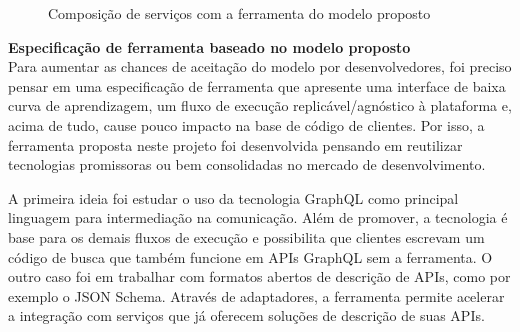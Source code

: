 \begin{figure}[H]
  \centering
  \caption{Composição de serviços com a ferramenta do modelo proposto}
\end{figure}

\textbf{Especificação de ferramenta baseado no modelo proposto} \\

Para aumentar as chances de aceitação do modelo por desenvolvedores, foi preciso pensar em uma especificação de ferramenta que apresente uma interface de baixa curva de aprendizagem, um fluxo de execução replicável/agnóstico à plataforma e, acima de tudo, cause pouco impacto na base de código de clientes. Por isso, a ferramenta proposta neste projeto foi desenvolvida pensando em reutilizar tecnologias promissoras ou bem consolidadas no mercado de desenvolvimento.

A primeira ideia foi estudar o uso da tecnologia GraphQL como principal linguagem para intermediação na comunicação. Além de promover, a tecnologia é base para os demais fluxos de execução e possibilita que clientes escrevam um código de busca que também funcione em APIs GraphQL sem a ferramenta. O outro caso foi em trabalhar com formatos abertos de descrição de APIs, como por exemplo o JSON Schema. Através de adaptadores, a ferramenta permite acelerar a integração com serviços que já oferecem soluções de descrição de suas APIs.

